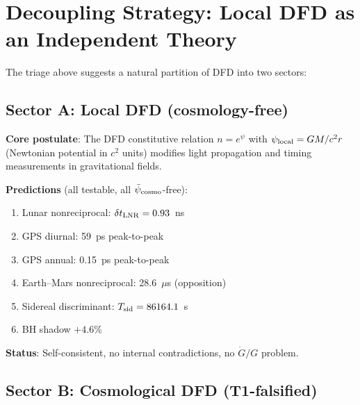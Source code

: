 \documentclass[11pt]{article}
\newcommand{\psicosmo}{\bar{\psi}_{\rm cosmo}}
\begin{document}
\section{Decoupling Strategy: Local DFD as an Independent Theory}
\label{sec:decoupling}

The triage above suggests a natural partition of DFD into two sectors:

\subsection{Sector A: Local DFD (cosmology-free)}

\begin{tcolorbox}[colback=green!5!white, colframe=green!60!black,
  title=\textbf{Sector A: Local DFD --- Survives T1}]
\textbf{Core postulate}: The DFD constitutive relation $n = e^\psi$ with
$\psi_{\rm local} = GM/c^2 r$ (Newtonian potential in $c^2$ units) modifies
light propagation and timing measurements in gravitational fields.

\textbf{Predictions} (all testable, all $\psicosmo$-free):
\begin{enumerate}[nosep]
\item Lunar nonreciprocal: $\delta t_{\rm LNR} = 0.93$~ns
\item GPS diurnal: 59~ps peak-to-peak
\item GPS annual: 0.15~ps peak-to-peak
\item Earth--Mars nonreciprocal: 28.6~$\mu$s (opposition)
\item Sidereal discriminant: $T_{\rm sid} = 86164.1$~s
\item BH shadow $+4.6\%$
\end{enumerate}

\textbf{Status}: Self-consistent, no internal contradictions, no $\dot{G}/G$ problem.
\end{tcolorbox}

\subsection{Sector B: Cosmological DFD (T1-falsified)}
\end{document}
